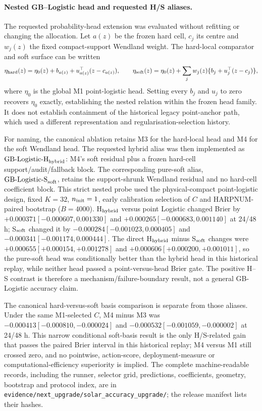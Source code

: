 \documentclass[11pt,a4paper]{article}
\numberwithin{equation}{section}
\theoremstyle{definition}\newtheorem{definition}[theorem]{Definition}
\theoremstyle{remark}\newtheorem{remark}[theorem]{Remark}
\begin{document}
\paragraph{Nested GB--Logistic head and requested H/S aliases.}
The requested probability-head extension was evaluated without refitting or changing the allocation. Let $a(z)$ be the frozen hard cell, $c_j$ its centre and $w_j(z)$ the fixed compact-support Wendland weight. The hard-local comparator and soft surface can be written
\[
\eta_{\rm hard}(z)=\eta_0(z)+b_{a(z)}+u_{a(z)}^\top(z-c_{a(z)}),\qquad
\eta_{\rm soft}(z)=\eta_0(z)+\sum_jw_j(z)\{b_j+u_j^\top(z-c_j)\},
\]
where $\eta_0$ is the global M1 point-logistic head. Setting every $b_j$ and $u_j$ to zero recovers $\eta_0$ exactly, establishing the nested relation within the frozen head family. It does not establish containment of the historical legacy point-anchor path, which used a different representation and regularisation-selection history.

For naming, the canonical ablation retains M3 for the hard-local head and M4 for the soft Wendland head. The requested hybrid alias was then implemented as $\mathrm{GB\text{-}Logistic\text{-}H}_{\rm hybrid}$: M4's soft residual plus a frozen hard-cell support/audit/fallback block. The corresponding pure-soft alias, $\mathrm{GB\text{-}Logistic\text{-}S}_{\rm soft}$, retains the support-shrunk Wendland residual and no hard-cell coefficient block. This strict nested probe used the physical-compact point-logistic design, fixed $K=32$, $n_{\rm init}=1$, early calibration selection of $C$ and HARPNUM-paired bootstrap ($B=4000$). H$_{\rm hybrid}$ versus point Logistic changed Brier by $+0.000371[-0.000607,0.001330]$ and $+0.000265[-0.000683,0.001140]$ at 24/48 h; S$_{\rm soft}$ changed it by $-0.000284[-0.001023,0.000405]$ and $-0.000341[-0.001174,0.000444]$. The direct H$_{\rm hybrid}$ minus S$_{\rm soft}$ changes were $+0.000655[+0.000154,+0.001278]$ and $+0.000606[+0.000200,+0.001011]$, so the pure-soft head was conditionally better than the hybrid head in this historical replay, while neither head passed a point-versus-head Brier gate. The positive H--S contrast is therefore a mechanism/failure-boundary result, not a general GB-Logistic accuracy claim.

The canonical hard-versus-soft basis comparison is separate from those aliases. Under the same M1-selected $C$, M4 minus M3 was $-0.000413[-0.000810,-0.000024]$ and $-0.000532[-0.001059,-0.000002]$ at 24/48 h. This narrow conditional soft-basis result is the only H/S-related gain that passes the paired Brier interval in this historical replay; M4 versus M1 still crossed zero, and no pointwise, action-score, deployment-measure or computational-efficiency superiority is implied. The complete machine-readable records, including the runner, selector grid, predictions, coefficients, geometry, bootstrap and protocol index, are in \texttt{evidence/next\_upgrade/solar\_accuracy\_upgrade/}; the release manifest lists their hashes.
\end{document}
